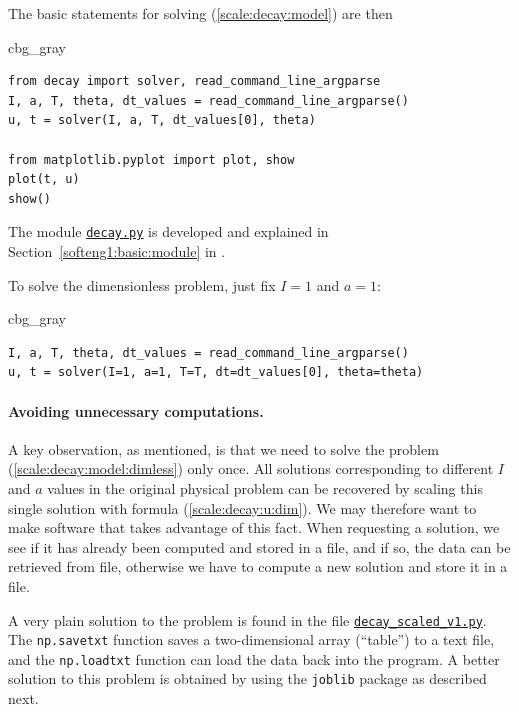 \documentclass[graybox,envcountchap,sectrefs,final]{svmonodo}
\newenvironment{_cod_tight}[1]{
   \def\FrameCommand{\colorbox{#1}}
   \FrameRule0.6pt\MakeFramed {\FrameRestore}\vskip3mm}
   {\vskip0mm\endMakeFramed}
\newenvironment{cod}[1]{
\bgroup\rmfamily
\fboxsep=0mm\relax
\begin{_cod_tight}{#1}
\list{}{\parsep=-2mm\parskip=0mm\topsep=0pt\leftmargin=2mm
\rightmargin=2\leftmargin\leftmargin=4pt\relax}
\item\relax}
{\endlist\end{_cod_tight}\egroup}
\begin{document}
\noindent
The basic statements for solving (\ref{scale:decay:model}) are
then

\begin{cod}{cbg_gray}\begin{Verbatim}[numbers=none,fontsize=\fontsize{9pt}{9pt},baselinestretch=0.95,xleftmargin=2mm]
from decay import solver, read_command_line_argparse
I, a, T, theta, dt_values = read_command_line_argparse()
u, t = solver(I, a, T, dt_values[0], theta)

from matplotlib.pyplot import plot, show
plot(t, u)
show()
\end{Verbatim}
\end{cod}
\noindent
The module \href{{http://tinyurl.com/o8pb3yy/decay.py}}{\nolinkurl{decay.py}} is developed
and explained in
Section~\ref{softeng1:basic:module} in \cite{Langtangen_decay}.

To solve the dimensionless problem, just fix $I=1$ and $a=1$:

\begin{cod}{cbg_gray}\begin{Verbatim}[numbers=none,fontsize=\fontsize{9pt}{9pt},baselinestretch=0.95,xleftmargin=2mm]
I, a, T, theta, dt_values = read_command_line_argparse()
u, t = solver(I=1, a=1, T=T, dt=dt_values[0], theta=theta)
\end{Verbatim}
\end{cod}
\noindent


\paragraph{Avoiding unnecessary computations.}
A key observation, as mentioned, is that we need to solve the problem
(\ref{scale:decay:model:dimless}) only once. All solutions
corresponding to different $I$ and $a$ values in the original physical
problem can be recovered by scaling this single solution with formula
(\ref{scale:decay:u:dim}).  We may therefore want to make software that
takes advantage of this fact. When requesting a solution, we see if it
has already been computed and stored in a file, and if so, the data
can be retrieved from file, otherwise we have to compute a new
solution and store it in a file.

A very plain solution to the problem is found in the file
\href{{http://tinyurl.com/o8pb3yy/decay_scaled_v1.py}}{\nolinkurl{decay_scaled_v1.py}}.
The \texttt{np.savetxt} function saves a two-dimensional array (``table'') to
a text file, and the \texttt{np.loadtxt} function can load the data back
into the program. A better solution to this problem is obtained
by using the \texttt{joblib} package as described next.
\end{document}
